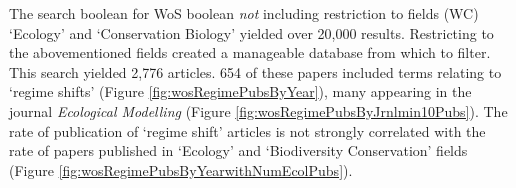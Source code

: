 \documentclass[12pt,twoside,openany]{reedthesis}
\newenvironment{Shaded}{\begin{snugshade}}{\end{snugshade}}
\newcommand{\CharTok}[1]{\textcolor[rgb]{0.31,0.60,0.02}{#1}}
\newcommand{\DataTypeTok}[1]{\textcolor[rgb]{0.13,0.29,0.53}{#1}}
\newcommand{\DecValTok}[1]{\textcolor[rgb]{0.00,0.00,0.81}{#1}}
\newcommand{\FloatTok}[1]{\textcolor[rgb]{0.00,0.00,0.81}{#1}}
\newcommand{\KeywordTok}[1]{\textcolor[rgb]{0.13,0.29,0.53}{\textbf{#1}}}
\newcommand{\NormalTok}[1]{#1}
\newcommand{\OperatorTok}[1]{\textcolor[rgb]{0.81,0.36,0.00}{\textbf{#1}}}
\newcommand{\StringTok}[1]{\textcolor[rgb]{0.31,0.60,0.02}{#1}}
\begin{document}
The search boolean for WoS boolean \emph{not} including restriction to fields (WC) `Ecology' and `Conservation Biology' yielded over 20,000 results. Restricting to the abovementioned fields created a manageable database from which to filter. This search yielded 2,776 articles. 654 of these papers included terms relating to `regime shifts' (Figure \ref{fig:wosRegimePubsByYear}), many appearing in the journal \emph{Ecological Modelling} (Figure \ref{fig:wosRegimePubsByJrnlmin10Pubs}). The rate of publication of `regime shift' articles is not strongly correlated with the rate of papers published in `Ecology' and `Biodiversity Conservation' fields (Figure \ref{fig:wosRegimePubsByYearwithNumEcolPubs}).
\begin{Shaded}
\end{Shaded}
\end{document}
